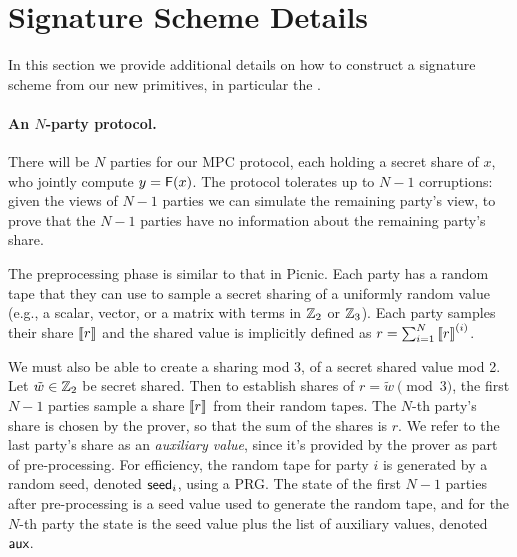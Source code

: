 









\section{Signature Scheme Details}
\label{appendix:picnic}
In this section we provide additional details on how to construct a signature scheme from our
new primitives, in particular the \ttOWF.


\paragraph{An $N$-party protocol.}
There will be $N$ parties for our MPC protocol, each holding a secret share of
$x$, who jointly compute $y = \mathsf{F}(x)$.  The protocol tolerates up to  $N-1$ 
corruptions: given the views of $N-1$ parties we can simulate the remaining
party's view, to prove that the $N-1$ parties have no information about the
remaining party's share. 

The preprocessing phase is similar to that in Picnic.  Each party has a random
tape that they can use to sample a secret sharing of a uniformly random value
(e.g.,  a scalar, vector, or a matrix with terms in $\mathbb{Z}_2$ or $\mathbb{Z}_3$).  Each
party samples their share $\left\llbracket r \right\rrbracket$ and the shared value is implicitly defined as
$r = \sum_{i=1}^N \left\llbracket r \right\rrbracket^{(i)}$.  

We must also be able to create a sharing mod 3, of a secret shared value mod 2.
Let $\tilde{w}\in\mathbb{Z}_2$ be secret shared.  Then to establish shares of $r = \tilde{w} \pmod
3$, the first $N-1$ parties sample a share $\left\llbracket r \right\rrbracket$ from their random tapes. The
$N$-th party's share is chosen by the prover, so that the sum of the shares is
$r$.  We refer to the last party's share as an \emph{auxiliary value}, since
it's provided by the prover as part of pre-processing.  For efficiency, the random
tape for  party $i$ is
generated by a random seed, denoted $\textsf{seed}_i$, using a PRG. The state of the first
$N-1$ parties after pre-processing is a seed value used to generate the random
tape, and for the $N$-th party the state is the seed value plus the list of
auxiliary values, denoted $\textsf{aux}$. 

